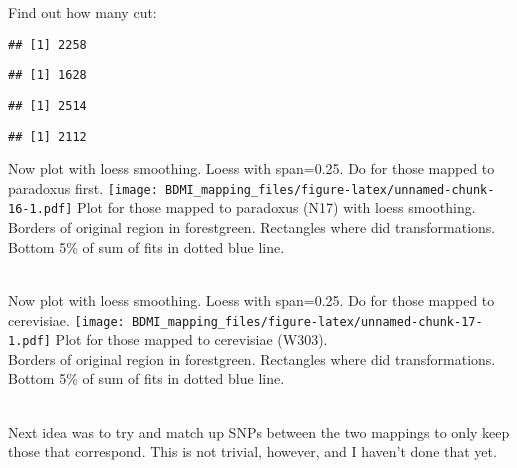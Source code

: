 \documentclass[
]{article}
\newenvironment{Shaded}{\begin{snugshade}}{\end{snugshade}}
\newcommand{\FunctionTok}[1]{\textcolor[rgb]{0.13,0.29,0.53}{\textbf{#1}}}
\newcommand{\NormalTok}[1]{#1}
\newcommand{\SpecialCharTok}[1]{\textcolor[rgb]{0.81,0.36,0.00}{\textbf{#1}}}
\begin{document}
Find out how many cut:

\begin{Shaded}
\end{Shaded}

\begin{verbatim}
## [1] 2258
\end{verbatim}

\begin{Shaded}
\end{Shaded}

\begin{verbatim}
## [1] 1628
\end{verbatim}

\begin{Shaded}
\end{Shaded}

\begin{verbatim}
## [1] 2514
\end{verbatim}

\begin{Shaded}
\end{Shaded}

\begin{verbatim}
## [1] 2112
\end{verbatim}

Now plot with loess smoothing. Loess with span=0.25. Do for those mapped
to paradoxus first.
\texttt{[image: BDMI\_mapping\_files/figure-latex/unnamed-chunk-16-1.pdf]}
Plot for those mapped to paradoxus (N17) with loess smoothing.\\
Borders of original region in forestgreen. Rectangles where did
transformations.\\
Bottom 5\% of sum of fits in dotted blue line.\\
\strut \\
Now plot with loess smoothing. Loess with span=0.25. Do for those mapped
to cerevisiae.
\texttt{[image: BDMI\_mapping\_files/figure-latex/unnamed-chunk-17-1.pdf]}
Plot for those mapped to cerevisiae (W303).\\
Borders of original region in forestgreen. Rectangles where did
transformations.\\
Bottom 5\% of sum of fits in dotted blue line.\\
\strut \\
Next idea was to try and match up SNPs between the two mappings to only
keep those that correspond. This is not trivial, however, and I haven't
done that yet.\\
\end{document}

